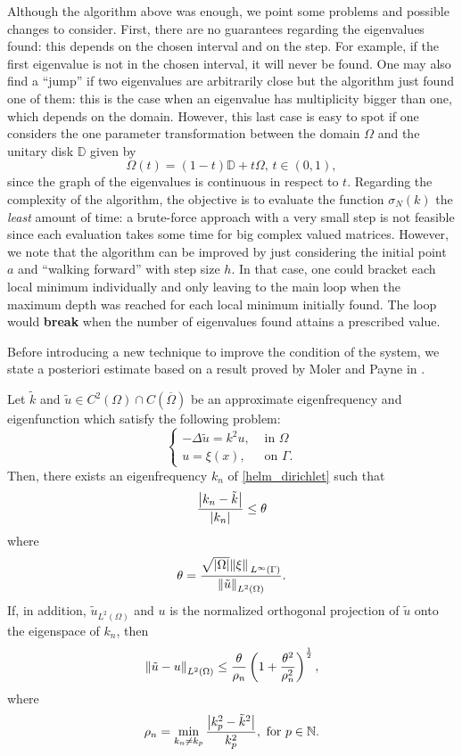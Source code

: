 \begin{remark}
    Although the algorithm above was enough, we point some problems and possible changes to consider. First, there are no guarantees regarding the eigenvalues found: this depends on the chosen interval and on the step. For example, if the first eigenvalue is not in the chosen interval, it will never be found. One may also find a ``jump'' if two eigenvalues are arbitrarily close but the algorithm just found one of them: this is the case when an eigenvalue has multiplicity bigger than one, which depends on the domain. However, this last case is easy to spot if one considers the one parameter transformation between the domain \(\Omega\) and the unitary disk \(\mathbb{D}\) given by
    \[
        \Omega(t) = (1-t)\mathbb{D} + t \Omega, \, t \in (0, 1),
    \]
    since the graph of the eigenvalues is continuous in respect to \(t\). Regarding the complexity of the algorithm, the objective is to evaluate the function \(\sigma_N(k)\) the \textit{least} amount of time: a brute-force approach with a very small step is not feasible since each evaluation takes some time for big complex valued matrices. However, we note that the algorithm can be improved by just considering the initial point \(a\) and ``walking forward'' with step size \(h\). In that case, one could bracket each local minimum individually and only leaving to the main loop when the maximum depth was reached for each local minimum initially found. The loop would \textbf{break} when the number of eigenvalues found attains a prescribed value.
\end{remark}

Before introducing a new technique to improve the condition of the system, we state a posteriori estimate based on a result proved by Moler and Payne in \cite{moler1968bounds}.
\begin{theorem}
    Let \(\tilde{k}\) and \(\tilde{u} \in C^2(\Omega) \cap C(\overline{\Omega})\) be an approximate eigenfrequency and eigenfunction which satisfy the following problem:
    \[
    \begin{cases}
        -\Delta \tilde{u} = k^2 u, &\text{ in } \Omega\\
        u = \xi(x), &\text{ on } \Gamma.
    \end{cases}    
    \]
    Then, there exists an eigenfrequency \(k_n\) of \eqref{helm_dirichlet} such that
    \[
        \frac{\abs{{k_n} - {\tilde{k}}}}{\abs{k_n}} \leq \theta
    \]
    where
    \[
        \theta = \frac{\sqrt{\abs{\Omega}} \norm*{\xi}_{L^\infty (\Gamma)}}{\norm{\tilde{u}}_{L^2(\Omega)}}.
    \]
    If, in addition, \(\tilde{u}_{L^2(\Omega)}\) and \(u\) is the normalized orthogonal projection of \(\tilde{u}\) onto the eigenspace of \(k_n\), then
    \[
        \norm{\tilde{u} - u}_{L^2(\Omega)} \leq \frac{\theta}{\rho_n}\left(1+\frac{\theta^2}{\rho_n^2}\right)^\frac{1}{2},
    \]
    where
    \[
        \rho_n = \min_{k_n \neq k_p} \frac{\abs{k^2_p - \tilde{k}^2}}{k^2_p}, \text{ for } p \in \mathbb{N}.
    \]
\end{theorem}

